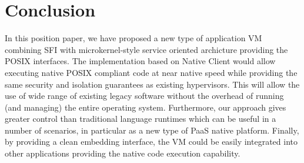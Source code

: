 \section{Conclusion}
\label{sec:conclusion}

In this position paper, we have proposed a new type of application VM
combining SFI with microkernel-style service oriented archicture
providing the POSIX interfaces. The implementation based on Native
Client would allow executing native POSIX compliant code at near native
speed while providing the same security and isolation guarantees as
existing hypervisors. This will allow the use of wide range of existing
legacy software without the overhead of running (and managing) the
entire operating system. Furthermore, our approach gives greater control
than traditional language runtimes which can be useful in a number of
scenarios, in particular as a new type of PaaS native platform. Finally,
by providing a clean embedding interface, the VM could be easily
integrated into other applications providing the native code execution
capability.
